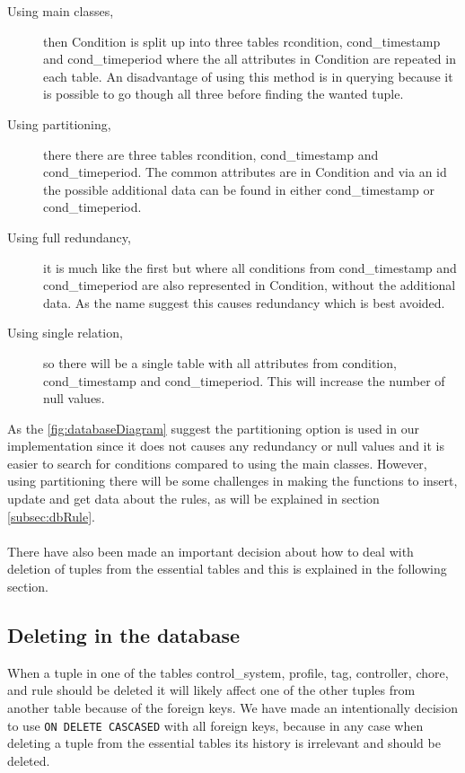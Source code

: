\begin{description}
	\item[Using main classes,] then Condition is split up into three tables rcondition, cond\_timestamp and cond\_timeperiod where the all attributes in Condition are repeated in each table. An disadvantage of using this method is in querying because it is possible to go though all three before finding the wanted tuple.
	\item[Using partitioning,] there there are three tables rcondition, cond\_timestamp and cond\_timeperiod. The common attributes are in Condition and via an id the possible additional data can be found in either cond\_timestamp or cond\_timeperiod.
	\item[Using full redundancy,] it is much like the first but where all conditions from cond\_timestamp and cond\_timeperiod are also represented in Condition, without the additional data. As the name suggest this causes redundancy which is best avoided.
	\item[Using single relation,] so there will be a single table with all attributes from condition, cond\_timestamp and cond\_timeperiod. This will increase the number of null values. 
\end{description}

As the \ref{fig:databaseDiagram} suggest the partitioning option is used in our implementation since it does not causes any redundancy or null values and it is easier to search for conditions compared to using the main classes. However, using partitioning there will be some challenges in making the functions to insert, update and get data about the rules, as will be explained in section \vref{subsec:dbRule}.\\\\


There have also been made an important decision about how to deal with deletion of tuples from the essential tables and this is explained in the following section.
 
\subsection{Deleting in the database}
When a tuple in one of the tables control\_system, profile, tag, controller, chore, and rule should be deleted it will likely affect one of the other tuples from another table because of the foreign keys. We have made an intentionally decision to use \texttt{ON DELETE CASCASED} with all foreign keys, because in any case when deleting a tuple from the essential tables its history is irrelevant and should be deleted.


